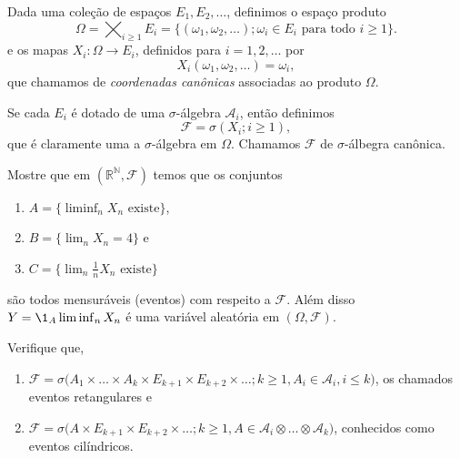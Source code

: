 Dada uma coleção de espaços $E_1, E_2, \dots$, definimos o espaço produto
\begin{equation}
  \Omega = \bigtimes_{i\geq 1} E_i = \big\{(\omega_1, \omega_2, \dots); \omega_i \in E_i \text{ para todo $i \geq 1$}\big\}.
\end{equation}
e os mapas $X_i:\Omega \to E_i$, definidos para $i = 1, 2, \dots$ por
\begin{equation}
  X_i(\omega_1, \omega_2, \dots) = \omega_i,
\end{equation}
que chamamos de \emph{coordenadas canônicas}  associadas ao produto $\Omega$.

Se cada $E_i$ é dotado de uma $\sigma$-álgebra $\mathcal{A}_i$, então definimos
\begin{equation}
  \mathcal{F} = \sigma(X_i; i \geq 1),
\end{equation}
que é claramente uma a $\sigma$-álgebra em $\Omega$.
Chamamos $\mathcal{F}$ de $\sigma$-álbegra canônica.

\begin{exercise}
  Mostre que em $(\mathbb{R}^{\mathbb{N}},\mathcal{F})$ temos que os conjuntos
  \begin{enumerate}[\quad a)]
  \item $A = \{ \liminf_n X_n \text{ existe}\}$,
  \item $B = \{ \lim_n X_n = 4\}$ e
  \item $C = \{ \lim_n \tfrac{1}{n} X_n \text{ existe}\}$
  \end{enumerate}
  são todos mensuráveis (eventos) com respeito a $\mathcal{F}$.
  Além disso $Y = \1_A \liminf_n X_n$ é uma variável aleatória em $(\Omega, \mathcal{F})$.
\end{exercise}

\begin{exercise}
  Verifique que,
  \begin{enumerate}[\quad a)]
  \item $\mathcal{F} = \sigma\big(A_1 \times \dots \times A_k \times E_{k+1} \times E_{k+2} \times \dots; k \geq 1, A_i \in \mathcal{A}_i, i \leq k\big)$, os chamados eventos retangulares e
  \item $\mathcal{F} = \sigma\big(A \times E_{k+1} \times E_{k+2} \times \dots; k \geq 1, A \in \mathcal{A}_i \otimes \dots \otimes \mathcal{A}_k\big)$, conhecidos como eventos cilíndricos.
  \end{enumerate}
\end{exercise}

